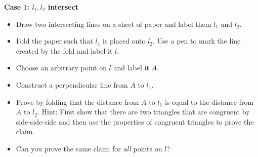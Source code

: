 \textbf{Case $1$: $l_1,l_2$ intersect} 
\begin{itemize}
\item Draw two intersecting lines on a sheet of paper and label them $l_1$ and $l_2$. 
\item Fold the paper such that $l_1$ is placed onto $l_2$. Use a pen to mark the line created by the fold and label it $l$.
\item Choose an arbitrary point on $l$ and label it $A$.
\item Construct a perpendicular line from $A$ to $l_1$.
\item Prove by folding that the distance from $A$ to $l_1$ is equal to the distance from $A$ to $l_2$. Hint: First show that there are two triangles that are congruent by side-side-side and then use the properties of congruent triangles to prove the claim.
\item Can you prove the same claim for \emph{all} points on $l$? 
\end{itemize}

\begin{center}
\end{center}

